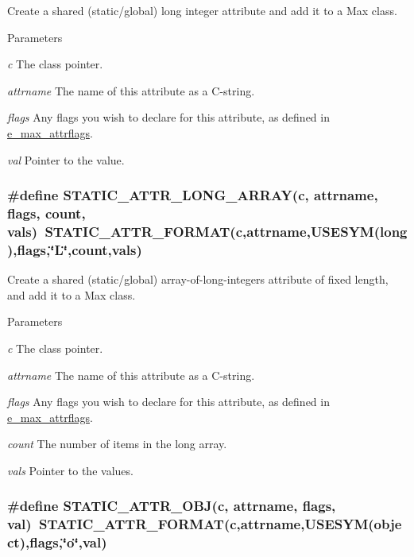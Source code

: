 Create a shared (static/global) long integer attribute and add it to a Max class. 
\begin{DoxyParams}{Parameters}
\item[{\em c}]The class pointer. \item[{\em attrname}]The name of this attribute as a C-\/string. \item[{\em flags}]Any flags you wish to declare for this attribute, as defined in \hyperlink{group__attr_gaf296cfc6741bb19207f6ed8062809115}{e\_\-max\_\-attrflags}. \item[{\em val}]Pointer to the value. \end{DoxyParams}
\hypertarget{group__attr_gad149c4538e87a6a45ea35a28c1c85929}{
\subsubsection[{STATIC\_\-ATTR\_\-LONG\_\-ARRAY}]{\setlength{\rightskip}{0pt plus 5cm}\#define STATIC\_\-ATTR\_\-LONG\_\-ARRAY(c, \/  attrname, \/  flags, \/  count, \/  vals)~STATIC\_\-ATTR\_\-FORMAT(c,attrname,USESYM(long),flags,\char`\"{}L\char`\"{},count,vals)}}
\label{group__attr_gad149c4538e87a6a45ea35a28c1c85929}


Create a shared (static/global) array-\/of-\/long-\/integers attribute of fixed length, and add it to a Max class. 
\begin{DoxyParams}{Parameters}
\item[{\em c}]The class pointer. \item[{\em attrname}]The name of this attribute as a C-\/string. \item[{\em flags}]Any flags you wish to declare for this attribute, as defined in \hyperlink{group__attr_gaf296cfc6741bb19207f6ed8062809115}{e\_\-max\_\-attrflags}. \item[{\em count}]The number of items in the long array. \item[{\em vals}]Pointer to the values. \end{DoxyParams}
\hypertarget{group__attr_ga14283a1fa1076d8cecd4b86565baa024}{
\subsubsection[{STATIC\_\-ATTR\_\-OBJ}]{\setlength{\rightskip}{0pt plus 5cm}\#define STATIC\_\-ATTR\_\-OBJ(c, \/  attrname, \/  flags, \/  val)~STATIC\_\-ATTR\_\-FORMAT(c,attrname,USESYM(object),flags,\char`\"{}o\char`\"{},val)}}
\label{group__attr_ga14283a1fa1076d8cecd4b86565baa024}



